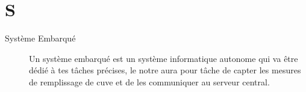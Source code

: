 \section{S}

\begin{description}

\item[Système Embarqué] Un système embarqué est un système informatique autonome
qui va être dédié à tes tâches précises, le notre aura pour tâche de capter les 
mesures de remplissage de cuve et de les communiquer au serveur central.

\end{description}


